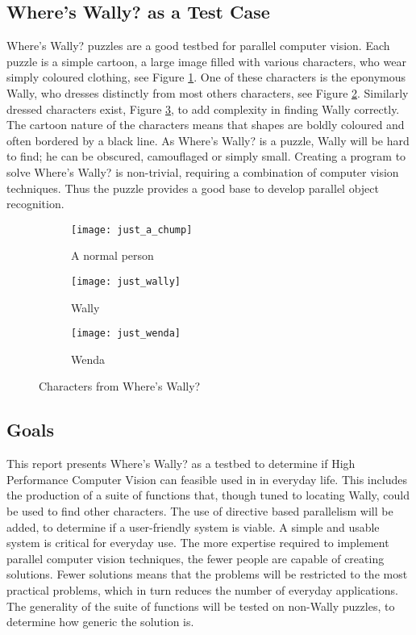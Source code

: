 \documentclass[../main.tex]{subfiles}
\begin{document}
    \subsection{Where's Wally? as a Test Case}
    Where's Wally? puzzles are a good testbed for parallel computer vision.
    Each puzzle is a simple cartoon, a large image filled with various characters, who wear simply coloured clothing, see Figure \ref{justachump}.
    One of these characters is the eponymous Wally, who dresses distinctly from most others characters, see Figure \ref{justwally}.
    Similarly dressed characters exist, Figure \ref{justwenda}, to add complexity in finding Wally correctly.
    The cartoon nature of the characters means that shapes are boldly coloured and often bordered by a black line.
    As Where's Wally? is a puzzle, Wally will be hard to find; he can be obscured, camouflaged or simply small.
    Creating a program to solve Where's Wally? is non-trivial, requiring a combination of computer vision techniques.
    Thus the puzzle provides a good base to develop parallel object recognition.

    \begin{figure}[H]
    \centering
      \begin{subfigure}[b]{0.3\textwidth}
        \centering
        \texttt{[image: just\_a\_chump]}   
        \caption{A normal person}
        \label{justachump}
      \end{subfigure}
      \begin{subfigure}[b]{0.3\textwidth}
        \centering
        \texttt{[image: just\_wally]}   
        \caption{Wally}
        \label{justwally}
      \end{subfigure}
      \begin{subfigure}[b]{0.3\textwidth}
        \centering
        \texttt{[image: just\_wenda]}   
        \caption{Wenda}
        \label{justwenda}
      \end{subfigure}
    \caption{Characters from Where's Wally?}
    \label{wallychars}
    \end{figure}
    \subsection{Goals}
    This report presents Where's Wally? as a testbed to determine if High Performance Computer Vision can feasible used in in everyday life.
    This includes the production of a suite of functions that, though tuned to locating Wally, could be used to find other characters.
    The use of directive based parallelism will be added, to determine if a user-friendly system is viable.
    A simple and usable system is critical for everyday use.
    The more expertise required to implement parallel computer vision techniques, the fewer people are capable of creating solutions.
    Fewer solutions means that the problems will be restricted to the most practical problems, which in turn reduces the number of everyday applications.
    The generality of the suite of functions will be tested on non-Wally puzzles, to determine how generic the solution is.
\end{document}
